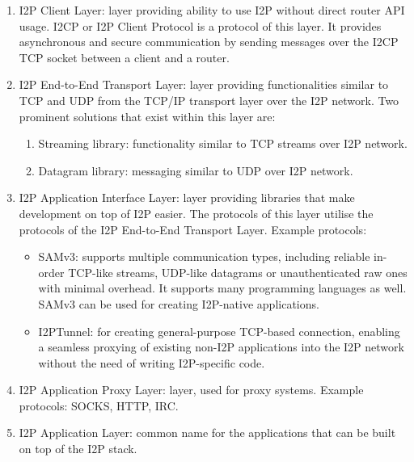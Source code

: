 \begin{enumerate}
    \item I2P Client Layer: layer providing ability to use I2P without direct router API usage. I2CP or I2P Client Protocol is a protocol of this layer. It provides asynchronous and secure communication by sending messages over the I2CP TCP socket between a client and a router.
    \item I2P End-to-End Transport Layer: layer providing functionalities similar to TCP and UDP from the TCP/IP transport layer over the I2P network. Two prominent solutions that exist within this layer are:
    \begin{enumerate}
        \item Streaming library: functionality similar to  TCP streams over I2P network.
        \item Datagram library: messaging similar to UDP over I2P network.
    \end{enumerate}
    \item I2P Application Interface Layer: layer providing libraries that make development on top of I2P easier. The protocols of this layer utilise the protocols of the I2P End-to-End Transport Layer. Example protocols:
    \begin{itemize}
        \item SAMv3: supports multiple communication types, including reliable in-order TCP-like streams, UDP-like datagrams or unauthenticated raw ones with minimal overhead. It supports many programming languages as well. SAMv3 can be used for creating I2P-native applications.
        \item I2PTunnel: for creating general-purpose TCP-based connection, enabling a seamless proxying of existing non-I2P applications into the I2P network without the need of writing I2P-specific code.
    \end{itemize}
    \item I2P Application Proxy Layer: layer, used for proxy systems. Example protocols: SOCKS, HTTP, IRC.
    \item I2P Application Layer: common name for the applications that can be built on top of the I2P stack.
\end{enumerate}

